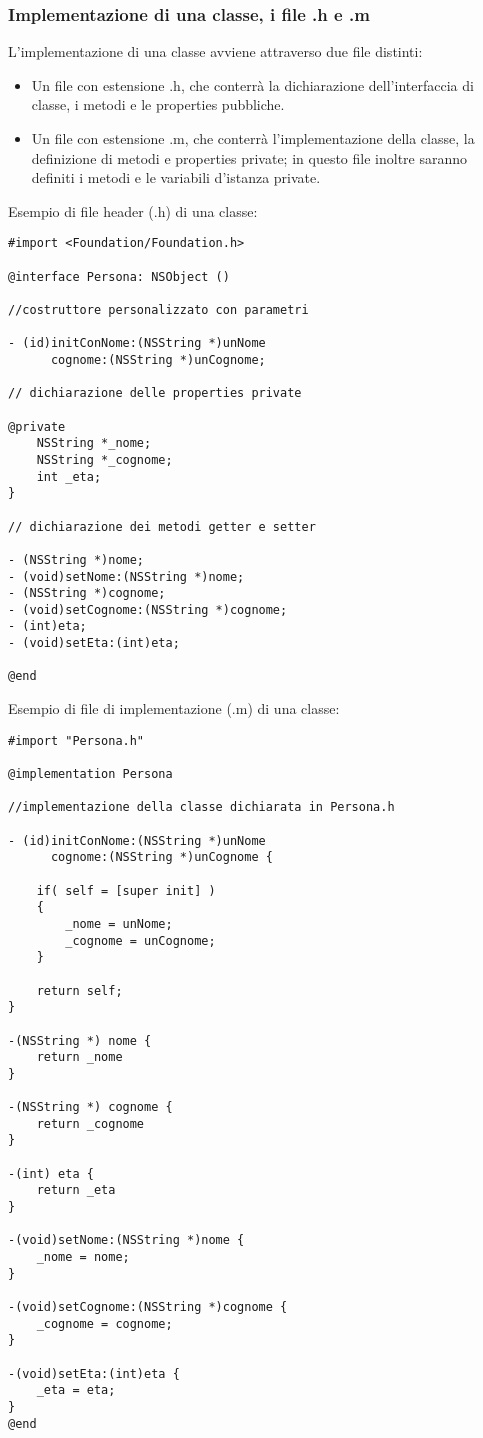 \subsubsection{Implementazione di una classe, i file .h e .m}
L'implementazione di una classe avviene attraverso due file distinti:
\begin{itemize}
\item Un file con estensione .h, che conterrà la dichiarazione dell'interfaccia di classe, i metodi e le properties pubbliche.
\item Un file con estensione .m, che conterrà l'implementazione della classe, la definizione di metodi e properties private; in questo file inoltre saranno definiti i metodi e le variabili d'istanza private.
\end{itemize}
\newpage
Esempio di file header (.h) di una classe:
\lstset{language=[Objective]C, breakindent=40pt, breaklines}
\begin{lstlisting}
#import <Foundation/Foundation.h>

@interface Persona: NSObject ()

//costruttore personalizzato con parametri 

- (id)initConNome:(NSString *)unNome
      cognome:(NSString *)unCognome;

// dichiarazione delle properties private 

@private
	NSString *_nome;
	NSString *_cognome;
	int _eta; 
}

// dichiarazione dei metodi getter e setter

- (NSString *)nome;
- (void)setNome:(NSString *)nome;
- (NSString *)cognome;
- (void)setCognome:(NSString *)cognome;
- (int)eta;
- (void)setEta:(int)eta;

@end
\end{lstlisting}
\bigskip
\bigskip
\bigskip
Esempio di file di implementazione (.m) di una classe:
\lstset{language=[Objective]C, breakindent=40pt, breaklines}
\begin{lstlisting}
#import "Persona.h" 

@implementation Persona

//implementazione della classe dichiarata in Persona.h

- (id)initConNome:(NSString *)unNome
      cognome:(NSString *)unCognome {
    
    if( self = [super init] )
    {
        _nome = unNome;
        _cognome = unCognome;
    }
    
    return self;
}
 
-(NSString *) nome {
	return _nome
}

-(NSString *) cognome {
	return _cognome
}

-(int) eta {
	return _eta
}

-(void)setNome:(NSString *)nome {
	_nome = nome;
}

-(void)setCognome:(NSString *)cognome {
	_cognome = cognome;
}

-(void)setEta:(int)eta {
	_eta = eta;
}
@end
\end{lstlisting}
